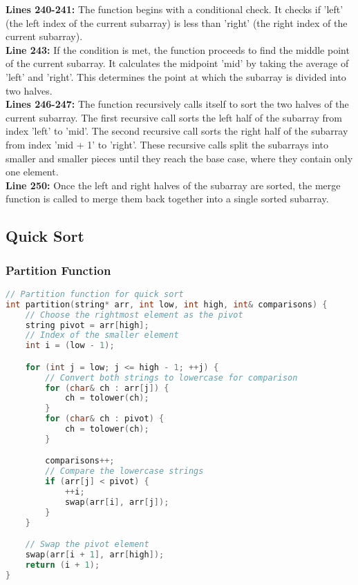 \documentclass[letterpaper, 10pt,DIV=13]{scrartcl}
\numberwithin{equation}{section} %
\numberwithin{figure}{section} %
\numberwithin{table}{section} %
\begin{document}
\textbf{Lines 240-241:} The function begins with a conditional check. It checks if 'left' (the left index of the current subarray) is less than 'right' (the right index of the current subarray). \\
\textbf{Line 243:} If the condition is met, the function proceeds to find the middle point of the current subarray. It calculates the midpoint 'mid' by taking the average of 'left' and 'right'. This determines the point at which the subarray is divided into two halves. \\
\textbf{Lines 246-247:} The function recursively calls itself to sort the two halves of the current subarray. The first recursive call sorts the left half of the subarray from index 'left' to 'mid'. The second recursive call sorts the right half of the subarray from index 'mid + 1' to 'right'. These recursive calls split the subarrays into smaller and smaller pieces until they reach the base case, where they contain only one element. \\
\textbf{Line 250:} Once the left and right halves of the subarray are sorted, the merge function is called to merge them back together into a single sorted subarray.

\subsection{Quick Sort}
\subsubsection{Partition Function}
\begin{linenumbers}
\begin{lstlisting}[language=C++, caption={Partition Function}, label={code:example}]
// Partition function for quick sort
int partition(string* arr, int low, int high, int& comparisons) {
    // Choose the rightmost element as the pivot
    string pivot = arr[high]; 
    // Index of the smaller element
    int i = (low - 1); 

    for (int j = low; j <= high - 1; ++j) {
        // Convert both strings to lowercase for comparison
        for (char& ch : arr[j]) {
            ch = tolower(ch);
        }
        for (char& ch : pivot) {
            ch = tolower(ch);
        }

        comparisons++;
        // Compare the lowercase strings
        if (arr[j] < pivot) {
            ++i; 
            swap(arr[i], arr[j]);
        }
    }

    // Swap the pivot element
    swap(arr[i + 1], arr[high]);
    return (i + 1);
}
\end{lstlisting}
\end{linenumbers}
\nolinenumbers
\end{document}
